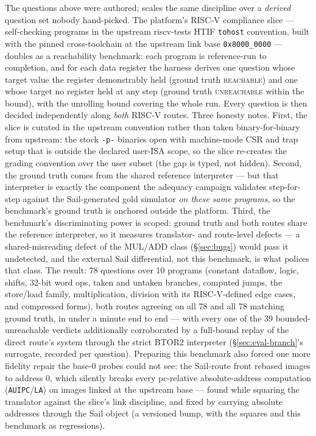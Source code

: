 {\setlength{\tabcolsep}{4pt}%
}

The questions above were authored;  scales the same
discipline over a \emph{derived} question set nobody hand-picked. The
platform's RISC-V compliance slice --- self-checking programs in the
upstream riscv-tests HTIF \texttt{tohost} convention, built with the
pinned cross-toolchain at the upstream link base \texttt{0x8000\_0000}
--- doubles as a reachability benchmark: each program is reference-run
to completion, and for each data register the harness derives one
question whose target value the register demonstrably held (ground
truth \textsc{reachable}) and one whose target no register held at any
step (ground truth \textsc{unreachable} within the bound), with the
unrolling bound covering the whole run. Every question is then decided
independently along \emph{both} RISC-V routes. Three honesty notes.
First, the slice is curated in the upstream convention rather than
taken binary-for-binary from upstream: the stock \texttt{-p-} binaries
open with machine-mode CSR and trap setup that is outside the declared
user-ISA scope, so the slice re-creates the grading convention over
the user subset (the gap is typed, not hidden). Second, the ground
truth comes from the shared reference interpreter --- but that
interpreter is exactly the component the adequacy campaign validates
step-for-step against the Sail-generated gold simulator \emph{on these
same programs}, so the benchmark's ground truth is anchored outside
the platform. Third, the benchmark's discriminating power is scoped:
ground truth and both routes share the reference interpreter, so it
measures translator- and route-level defects --- a shared-misreading
defect of the MUL/ADD class (\S\ref{sec:bugs}) would pass it
undetected, and the external Sail differential, not this benchmark,
is what polices that class. The result: 78 questions over 10 programs (constant
dataflow, logic, shifts, 32-bit word ops, taken and untaken branches,
computed jumps, the store/load family, multiplication, division with
its RISC-V-defined edge cases, and compressed forms), both routes
agreeing on all 78 and all 78 matching ground truth, in under a minute
end to end --- with every one of the 39 bounded-unreachable verdicts
additionally corroborated by a full-bound replay of the direct route's
system through the strict BTOR2 interpreter (\S\ref{sec:eval-branch}'s
surrogate, recorded per question). Preparing this benchmark also forced one more fidelity
repair the base-0 probes could not see: the Sail-route front rebased
images to address 0, which silently breaks every pc-relative
absolute-address computation (\texttt{AUIPC}/\texttt{LA}) on images
linked at the upstream base --- found while squaring the translator
against the slice's link discipline, and fixed by carrying absolute
addresses through the Sail object (a versioned bump, with the squares
and this benchmark as regressions).


